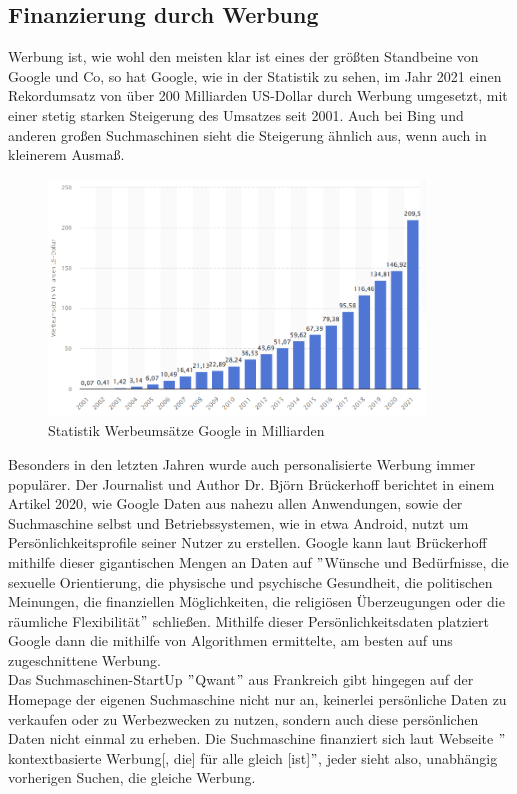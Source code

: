 \subsection{Finanzierung durch Werbung}\label{subsec:finanzierung-durch-werbung}
Werbung ist, wie wohl den meisten klar ist eines der größten Standbeine von Google und Co,
so hat Google, wie in der Statistik zu sehen, im Jahr 2021 einen Rekordumsatz von über 200 Milliarden US-Dollar durch Werbung umgesetzt,
mit einer stetig starken Steigerung des Umsatzes seit 2001.
Auch bei Bing und anderen großen Suchmaschinen sieht die Steigerung ähnlich aus, wenn auch in kleinerem Ausmaß.
\begin{figure}[ht]
    \centering
    \includegraphics[width=100mm]{images/statistic_google_ads}
    \caption{Statistik Werbeumsätze Google in Milliarden}
    \label{fig:statisticAdsGoogle}
\end{figure}
Besonders in den letzten Jahren wurde auch personalisierte Werbung immer populärer.
Der Journalist und Author Dr. Björn Brückerhoff berichtet in einem Artikel 2020,
wie Google Daten aus nahezu allen Anwendungen, sowie der Suchmaschine selbst und Betriebssystemen,
wie in etwa Android, nutzt um Persönlichkeitsprofile seiner Nutzer zu erstellen.
Google kann laut Brückerhoff mithilfe dieser gigantischen Mengen an Daten auf \("\)Wünsche und Bedürfnisse,
die sexuelle Orientierung, die physische und psychische Gesundheit, die politischen Meinungen, die finanziellen Möglichkeiten,
die religiösen Überzeugungen oder die räumliche Flexibilität\("\)\autocite{BRK20} schließen.
Mithilfe dieser Persönlichkeitsdaten platziert Google dann die mithilfe von Algorithmen ermittelte,
am besten auf uns zugeschnittene Werbung.\autocite{BRK20}\\

Das Suchmaschinen-StartUp \("\)Qwant\("\) aus Frankreich gibt hingegen auf der Homepage der eigenen Suchmaschine nicht nur an,
keinerlei persönliche Daten zu verkaufen oder zu Werbezwecken zu nutzen, sondern auch diese persönlichen Daten nicht einmal zu erheben.
Die Suchmaschine finanziert sich laut Webseite \("\)kontextbasierte Werbung[, die] für alle gleich [ist]\("\)\autocite{QWA22},
jeder sieht also, unabhängig vorherigen Suchen, die gleiche Werbung.

